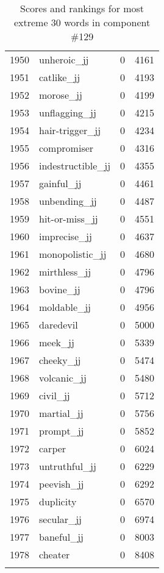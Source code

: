 \begin{longtable}[!htbp]{| rlr@{.}l |}
    1950 & unheroic\_jj & 0 & 4161 \\
    1951 & catlike\_jj & 0 & 4193 \\
    1952 & morose\_jj & 0 & 4199 \\
    1953 & unflagging\_jj & 0 & 4215 \\
    1954 & hair-trigger\_jj & 0 & 4234 \\
    1955 & compromiser & 0 & 4316 \\
    1956 & indestructible\_jj & 0 & 4355 \\
    1957 & gainful\_jj & 0 & 4461 \\
    1958 & unbending\_jj & 0 & 4487 \\
    1959 & hit-or-miss\_jj & 0 & 4551 \\
    1960 & imprecise\_jj & 0 & 4637 \\
    1961 & monopolistic\_jj & 0 & 4680 \\
    1962 & mirthless\_jj & 0 & 4796 \\
    1963 & bovine\_jj & 0 & 4796 \\
    1964 & moldable\_jj & 0 & 4956 \\
    1965 & daredevil & 0 & 5000 \\
    1966 & meek\_jj & 0 & 5339 \\
    1967 & cheeky\_jj & 0 & 5474 \\
    1968 & volcanic\_jj & 0 & 5480 \\
    1969 & civil\_jj & 0 & 5712 \\
    1970 & martial\_jj & 0 & 5756 \\
    1971 & prompt\_jj & 0 & 5852 \\
    1972 & carper & 0 & 6024 \\
    1973 & untruthful\_jj & 0 & 6229 \\
    1974 & peevish\_jj & 0 & 6292 \\
    1975 & duplicity & 0 & 6570 \\
    1976 & secular\_jj & 0 & 6974 \\
    1977 & baneful\_jj & 0 & 8003 \\
    1978 & cheater & 0 & 8408 \\
    \hline
    \caption{Scores and rankings for most extreme 30 words in component \#129} \\
\end{longtable}

